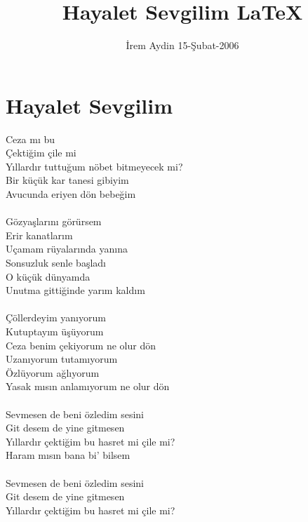 \documentclass{proc}
\begin{document}
\title{Hayalet Sevgilim \LaTeX{}}
\author{\.{I}rem Aydin 15-\c{S}ubat-2006}

\maketitle

\section{Hayalet Sevgilim}

Ceza m{\i} bu\\
\c{C}ekti\u{g}im \c{c}ile mi\\
Y{\i}llard{\i}r tuttu\u{g}um n\"{o}bet bitmeyecek mi?\\
Bir k\"{u}\c{c}\"{u}k kar tanesi gibiyim\\
Avucunda eriyen d\"{o}n bebe\u{g}im\\
\\
G\"{o}zyaşlar{\i}n{\i} g\"{o}r\"{u}rsem\\
Erir kanatlar{\i}m\\
U\c{c}amam r\"{u}yalar{\i}nda yan{\i}na\\
Sonsuzluk senle başlad{\i}\\
O k\"{u}\c{c}\"{u}k d\"{u}nyamda\\
Unutma gitti\u{g}inde yar{\i}m kald{\i}m\\
\\
\c{C}\"{o}llerdeyim yan{\i}yorum\\
Kutuptay{\i}m \"{u}ş\"{u}yorum\\
Ceza benim \c{c}ekiyorum ne olur d\"{o}n\\
Uzan{\i}yorum tutam{\i}yorum\\
\"{O}zl\"{u}yorum a\u{g}l{\i}yorum\\
Yasak m{\i}s{\i}n anlam{\i}yorum ne olur d\"{o}n\\
\\
Sevmesen de beni \"{o}zledim sesini\\
Git desem de yine gitmesen\\
Y{\i}llard{\i}r \c{c}ekti\u{g}im bu hasret mi \c{c}ile mi?\\
Haram m{\i}s{\i}n bana bi' bilsem\\
\\
Sevmesen de beni \"{o}zledim sesini\\
Git desem de yine gitmesen\\
Y{\i}llard{\i}r \c{c}ekti\u{g}im bu hasret mi \c{c}ile mi?\\
\end{document}
